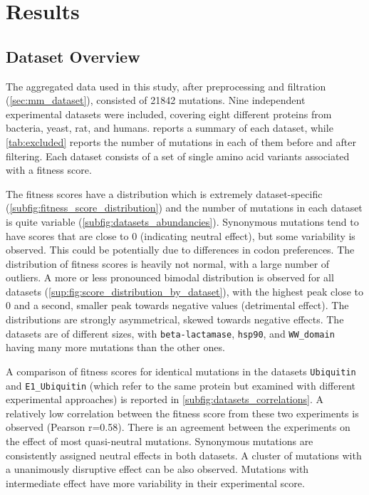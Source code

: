\cleardoublepage%
\chapter{Results}

\section{Dataset Overview}\label{sec:res_dataset}
The aggregated data used in this study, after preprocessing and filtration (\cref{sec:mm_dataset}), consisted of \num{21842} mutations.
Nine independent experimental datasets were included, covering eight different proteins from bacteria, yeast, rat, and humans.
 reports a summary of each dataset, while \cref{tab:excluded} reports the number of mutations in each of them before and after filtering.
Each dataset consists of a set of single amino acid variants associated with a fitness score.

The fitness scores have a distribution which is extremely dataset-specific (\cref{subfig:fitness_score_distribution}) and the number of mutations in each dataset is quite variable (\cref{subfig:datasets_abundancies}).
Synonymous mutations tend to have scores that are close to \num{0} (indicating neutral effect), but some variability is observed.
This could be potentially due to differences in codon preferences.
The distribution of fitness scores is heavily not normal, with a large number of outliers.
A more or less pronounced bimodal distribution is observed for all datasets (\cref{sup:fig:score_distribution_by_dataset}), with the highest peak close to \num{0} and a second, smaller peak towards negative values (detrimental effect).
The distributions are strongly asymmetrical, skewed towards negative effects.
The datasets are of different sizes, with \texttt{beta-lactamase}, \texttt{hsp90}, and \texttt{WW\_domain} having many more mutations than the other ones.

A comparison of fitness scores for identical mutations in the datasets \texttt{Ubiquitin} and \texttt{E1\_Ubiquitin} (which refer to the same protein but examined with different experimental approaches) is reported in \cref{subfig:datasets_correlations}.
A relatively low correlation between the fitness score from these two experiments is observed (Pearson r=\num{0.58}).
There is an agreement between the experiments on the effect of most quasi-neutral mutations.
Synonymous mutations are consistently assigned neutral effects in both datasets.
A cluster of mutations with a unanimously disruptive effect can be also observed.
Mutations with intermediate effect have more variability in their experimental score.

